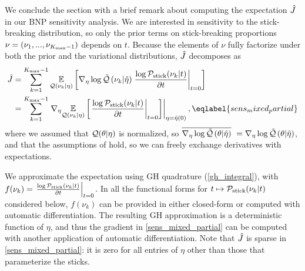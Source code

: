We conclude the section with a brief remark about computing the expectation
$\hat J$ in our BNP sensitivity analysis.
We are interested in sensitivity to the stick-breaking distribution,
so only the prior terms on stick-breaking proportions
$\nu = (\nu_1, ..., \nu_{{K_{\mathrm{max}}} - 1})$ depends on $t$.
Because the elements of $\nu$ fully factorize
under both the prior and the variational distributions,
$\hat J$ decomposes as
\begin{align}
  \crosshessian &=
  \sum_{\k=1}^{\kmax - 1}
          \expect{\q(\nuk \vert \eta)}
                 {
                 \lqgrad{\nuk \vert \etaopt}
                 \fracat{\log \pstick(\nuk \vert \t)}{\partial \t}{\t = 0}
                 } \notag\\
  &= \sum_{\k=1}^{\kmax - 1}
         \evalat{\nabla_\eta \expect{\q(\nuk \vert \eta)}
                {
                \fracat{\log \pstick(\nuk \vert \t)}{\partial \t}{\t = 0}
                }}{\eta = \etaopt(0)},
\eqlabel{sens_mixed_partial}
\end{align}
where we assumed that $\mathcal{Q}(\theta \vert \eta)$ is normalized, so
$\overline{{\nabla_\eta \log \tilde{\mathcal{Q}}}\left(\theta \vert \hat\eta\right)}\,\, = {\nabla_\eta \log \tilde{\mathcal{Q}}}\left(\theta \vert \hat\eta\right)$,
and that the assumptions of  hold, so we
can freely exchange derivatives with expectations.

We approximate the expectation using GH quadrature (\eqref{gh_integral}),
with
$f(\nu_k) = \left.\frac{\log \mathcal{P}_{\mathrm{stick}}(\nu_{k} \vert t)}{\partial t}\right\vert_{t = 0}$.
In all the functional forms for
$t \mapsto \mathcal{P}_{\mathrm{stick}}(\nu_{k} \vert t)$ considered below,
$f(\nu_k)$ can be provided in either closed-form or computed with automatic differentiation.
The resulting GH approximation is a deterministic function of $\eta$,
and thus the gradient in \eqref{sens_mixed_partial} can be computed
with another application of automatic differentiation.
Note that $\hat J$ is sparse in \eqref{sens_mixed_partial}:
it is zero for all entries of
$\eta$ other than those that parameterize the sticks.
